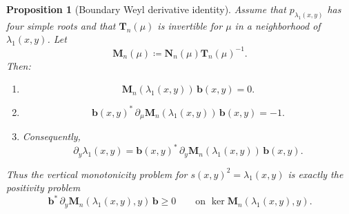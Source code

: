 \documentclass[11pt]{article}
\newtheorem{proposition}[theorem]{Proposition}
\begin{document}
\begin{proposition}[Boundary Weyl derivative identity]\label{prop:boundary-weyl-derivative}
Assume that \(p_{\lambda_1(x,y)}\) has four simple roots and that \(\mathbf T_n(\mu)\) is invertible for \(\mu\) in a neighborhood of \(\lambda_1(x,y)\). Let
\[
\mathbf M_n(\mu)\coloneqq \mathbf N_n(\mu)\mathbf T_n(\mu)^{-1}.
\]
Then:
\begin{enumerate}
\item
\[
\mathbf M_n(\lambda_1(x,y))\,\mathbf b(x,y)=0.
\]
\item
\[
\mathbf b(x,y)^*\,\partial_\mu \mathbf M_n(\lambda_1(x,y))\,\mathbf b(x,y)=-1.
\]
\item Consequently,
\[
\boxed{
\partial_y \lambda_1(x,y)
=
\mathbf b(x,y)^*\,\partial_y \mathbf M_n(\lambda_1(x,y))\,\mathbf b(x,y).
}
\]
\end{enumerate}
Thus the vertical monotonicity problem for \(s(x,y)^2=\lambda_1(x,y)\) is exactly the positivity problem
\[
\mathbf b^*\,\partial_y \mathbf M_n(\lambda_1(x,y),y)\,\mathbf b\ge 0
\qquad
\text{on }\ker \mathbf M_n(\lambda_1(x,y),y).
\]
\end{proposition}
\end{document}

